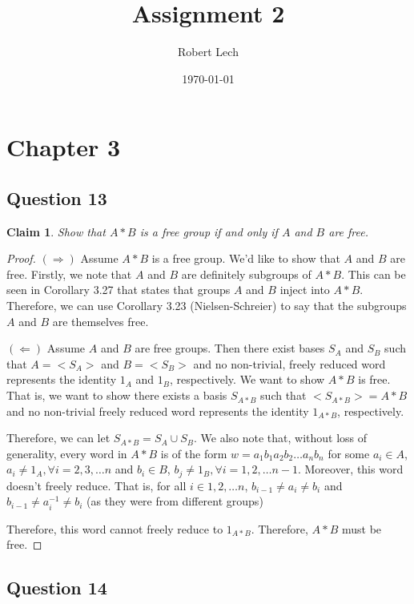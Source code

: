 \documentclass[12pt]{article}%
\newtheorem*{claim*}{Claim}
\begin{document}
\title{Assignment 2}
\author{Robert Lech}
\date{\today}
\maketitle
\section*{Chapter 3}

\subsection*{Question 13}

\begin{claim*}
Show that $A*B$ is a free group if and only if $A$ and $B$ are free.
\end{claim*}

\begin{proof}
$(\Rightarrow)$ Assume $A*B$ is a free group. We'd like to show that $A$ and $B$ are free. Firstly, we
note that $A$ and $B$ are definitely subgroups of $A*B$. This can be seen in Corollary 3.27 that states
that groups $A$ and $B$ inject into $A*B$. Therefore, we can use Corollary 3.23 (Nielsen-Schreier) to say
that the subgroups $A$ and $B$ are themselves free.

$(\Leftarrow)$ Assume $A$ and $B$ are free groups. Then there exist bases $S_A$ and $S_B$ such that
$A=<S_A>$ and $B=<S_B>$ and no non-trivial, freely reduced word represents the identity $1_A$ and $1_B$,
respectively. We want to show $A*B$ is free. That is, we want to show there exists a basis $S_{A*B}$ such
that $<S_{A*B}>=A*B$ and no non-trivial freely reduced word represents the identity $1_{A*B}$,
respectively.

Therefore, we can let $S_{A*B}=S_A \cup S_B$. We also note that, without loss of generality, every word in
$A*B$ is of the form $w=a_{1}b_{1}a_{2}b_{2}\ldots a_{n}b_{n}$ for some $a_i\in A$, $a_i \neq 1_A, \forall
i=2,3,\ldots n$ and $b_i\in B$, $b_j \neq 1_B, \forall i=1,2,\ldots n-1$. Moreover, this word doesn't
freely reduce. That is, for all $i\in {1, 2, \ldots n}$, $b_{i-1} \neq a_i \neq b_i$ and $b_{i-1} \neq
a_i^{-1} \neq b_i$ (as they were from different groups)

Therefore, this word cannot freely reduce to $1_{A*B}$. Therefore, $A*B$ must be free.
\end{proof}

\subsection*{Question 14}
\end{document}
